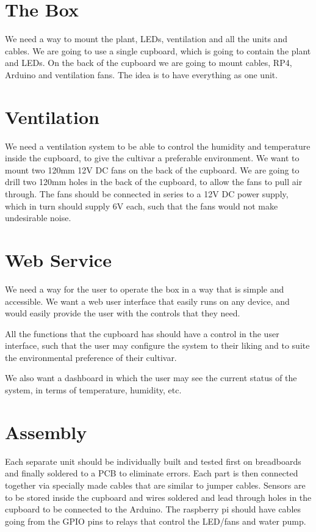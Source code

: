 \documentclass[12pt,a4paper,oneside]{book}
\begin{document}
\section{The Box}
We need a way to mount the plant, LEDs, ventilation and all the units and cables. We are going to use a single cupboard, which is going to contain the plant and LEDs. On the back of the cupboard we are going to mount cables, RP4, Arduino and ventilation fans. The idea is to have everything as one unit.

\section{Ventilation}
We need a ventilation system to be able to control the humidity and temperature inside the cupboard, to give the cultivar a preferable environment.
We want to mount two 120mm 12V DC fans on the back of the cupboard.
We are going to drill two 120mm holes in the back of the cupboard, to allow the fans to pull air through. The fans should be connected in series to a 12V DC power supply, which in turn should supply 6V each, such that the fans would not make undesirable noise.

\section{Web Service}
We need a way for the user to operate the box in a way that is simple and accessible. We want a web user interface that easily runs on any device, and would easily provide the user with the controls that they need.

All the functions that the cupboard has should have a control in the user interface, such that the user may configure the system to their liking and to suite the environmental preference of their cultivar.

We also want a dashboard in which the user may see the current status of the system, in terms of temperature, humidity, etc.

\section{Assembly}
Each separate unit should be individually built and tested first on breadboards and finally soldered to a PCB to eliminate errors. Each part is then connected together via specially made cables that are similar to jumper cables. Sensors are to be stored inside the cupboard and wires soldered and lead through holes in the cupboard to be connected to the Arduino. The raspberry pi should have cables going from the GPIO pins to relays that control the LED/fans and water pump.
\end{document}
